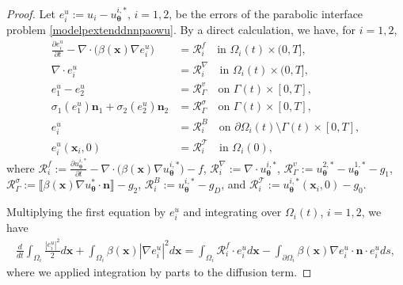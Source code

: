 \documentclass[10pt,a4paper]{amsart}
\begin{document}
\begin{proof}
Let $e^u_i := u_i - u_{\boldsymbol{\theta}}^{i,*}$, $i = 1, 2$, be the errors of the parabolic interface problem \eqref{modelpextenddnnpaowu}. By a direct calculation, we have, for $i = 1, 2$,
\begin{equation}
\begin{aligned}
\frac{\partial e^u_i}{\partial t} - \nabla \cdot \bigl(\beta(\boldsymbol{x}) \nabla e^u_i\bigr) &= \mathcal{R}^f_i \quad \text{in } \Omega_i(t) \times (0, T], \\
\nabla \cdot e^u_i &= \mathcal{R}^{\nabla}_i \quad \text{in } \Omega_i(t) \times (0, T], \\
e^u_1 - e^u_2 &= \mathcal{R}^v_{\Gamma} \quad \text{on } \Gamma(t) \times [0, T], \\
\sigma_1(e^u_1)\boldsymbol{n}_1 + \sigma_2(e^u_2)\boldsymbol{n}_2 &= \mathcal{R}^{\sigma}_{\Gamma} \quad \text{on } \Gamma(t) \times [0, T], \\
e^u_i &= \mathcal{R}^{B}_i \quad \text{on } \partial\Omega_i(t) \setminus \Gamma(t) \times [0, T], \\
e^u_i(\boldsymbol{x}_i, 0) &= \mathcal{R}^{\mathcal{T}}_i \quad \text{in } \Omega_i(0),
\end{aligned}
\end{equation}
where $\mathcal{R}^f_i := \frac{\partial u_{\boldsymbol{\theta}}^{i,*}}{\partial t} - \nabla \cdot \bigl(\beta(\boldsymbol{x}) \nabla u_{\boldsymbol{\theta}}^{i,*}\bigr) - f$, $\mathcal{R}^{\nabla}_i := \nabla \cdot u_{\boldsymbol{\theta}}^{i,*}$, $\mathcal{R}^v_{\Gamma} := u_{\boldsymbol{\theta}}^{2,*} - u_{\boldsymbol{\theta}}^{1,*} - g_1$, $\mathcal{R}^{\sigma}_{\Gamma} := \llbracket \beta(\boldsymbol{x}) \nabla u_{\boldsymbol{\theta}}^{*} \cdot \boldsymbol{n} \rrbracket - g_2$, $\mathcal{R}^{B}_i := u_{\boldsymbol{\theta}}^{i,*} - g_D$, and $\mathcal{R}^{\mathcal{T}}_i := u_{\boldsymbol{\theta}}^{i,*}(\boldsymbol{x}_i, 0) - g_0$.

Multiplying the first equation by $e^u_i$ and integrating over $\Omega_i(t)$, $i = 1, 2$, we have
\begin{equation}
\begin{aligned}
\frac{d}{dt} \int_{\Omega_i} \frac{|e^u_i|^2}{2} d\boldsymbol{x} + \int_{\Omega_i} \beta(\boldsymbol{x})|\nabla e^u_i|^2 d\boldsymbol{x} = \int_{\Omega_i} \mathcal{R}^f_i \cdot e^u_i d\boldsymbol{x} - \int_{\partial \Omega_i} \beta(\boldsymbol{x}) \nabla e^u_i \cdot \boldsymbol{n} \cdot e^u_i ds,
\end{aligned}
\end{equation}
where we applied integration by parts to the diffusion term. 


\end{proof}
\end{document}
